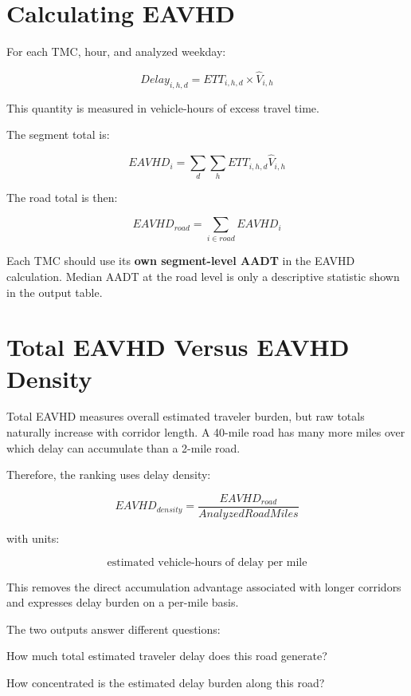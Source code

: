 \documentclass[11pt]{article}
\begin{document}
\section{Calculating EAVHD}

For each TMC, hour, and analyzed weekday:

\[
\boxed{
Delay_{i,h,d} = ETT_{i,h,d} \times \hat V_{i,h}
}
\]

This quantity is measured in vehicle-hours of excess travel time.

The segment total is:

\[
\boxed{
EAVHD_i = \sum_d \sum_h ETT_{i,h,d}\hat V_{i,h}
}
\]

The road total is then:

\[
\boxed{
EAVHD_{road} = \sum_{i\in road} EAVHD_i
}
\]

Each TMC should use its \textbf{own segment-level AADT} in the EAVHD calculation. Median AADT at the road level is only a descriptive statistic shown in the output table.

\section{Total EAVHD Versus EAVHD Density}

Total EAVHD measures overall estimated traveler burden, but raw totals naturally increase with corridor length. A 40-mile road has many more miles over which delay can accumulate than a 2-mile road.

Therefore, the ranking uses delay density:

\[
\boxed{
EAVHD_{density} = \frac{EAVHD_{road}}{AnalyzedRoadMiles}
}
\]

with units:

\[
\boxed{\text{estimated vehicle-hours of delay per mile}}
\]

This removes the direct accumulation advantage associated with longer corridors and expresses delay burden on a per-mile basis.

The two outputs answer different questions:

\begin{description}[leftmargin=2.3cm,style=nextline]
    \item[Total EAVHD] How much total estimated traveler delay does this road generate?
    \item[EAVHD per mile] How concentrated is the estimated delay burden along this road?
\end{description}
\end{document}
